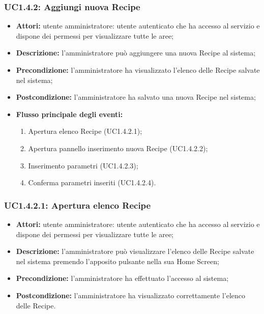 \subsubsection{UC1.4.2: Aggiungi nuova Recipe}
\begin{itemize}
    \item \textbf{Attori:} utente amministratore: utente autenticato che ha accesso al servizio e dispone dei permessi per visualizzare tutte le aree;
    \item \textbf{Descrizione:} l'amministratore può aggiungere una nuova Recipe\gloss{} al sistema;
    \item \textbf{Precondizione:} l'amministratore ha visualizzato l'elenco delle Recipe\gloss{} salvate nel sistema;
    \item \textbf{Postcondizione:} l'amministratore ha salvato una nuova Recipe\gloss{} nel sistema;
	\item \textbf{Flusso principale degli eventi:}
    \begin{enumerate}
        \item Apertura elenco Recipe\gloss{} (UC1.4.2.1);
        \item Apertura pannello inserimento nuova Recipe\gloss{} (UC1.4.2.2);
        \item Inserimento parametri (UC1.4.2.3);
        \item Conferma parametri inseriti (UC1.4.2.4).
    \end{enumerate}
\end{itemize}
\subsubsection{UC1.4.2.1: Apertura elenco Recipe}

\begin{itemize}
    \item \textbf{Attori:} utente amministratore: utente autenticato che ha accesso al servizio e dispone dei permessi per visualizzare tutte le aree;
    \item \textbf{Descrizione:} l'amministratore può visualizzare l'elenco delle Recipe\gloss{} salvate nel sistema premendo l'apposito pulsante nella sua Home Screen;
    \item \textbf{Precondizione:} l'amministratore ha effettuato l'accesso al sistema;
    \item \textbf{Postcondizione:} l'amministratore ha visualizzato correttamente l'elenco delle Recipe\gloss{}.
\end{itemize}

